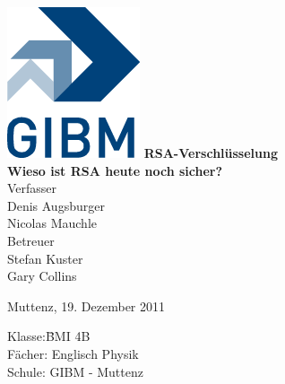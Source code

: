 \begin{titlepage}
\sffamily
\centering
\includegraphics{images/gibm_logo.png}
\vfill
{\bfseries\Huge RSA-Verschlüsselung}\\
\vfill
{\bfseries\Large Wieso ist RSA heute noch sicher?}\\
\vfill
Verfasser\\[1ex]
Denis Augsburger\\
Nicolas Mauchle\\
\vfill
Betreuer\\[1ex]
{\large Stefan Kuster}\\
{\large Gary Collins}\\
\vfill
\raggedright
\small
Muttenz, 19. Dezember 2011\\[2cm]
\begin{tabbing}
Klasse:\quad\quad\quad \=BMI 4B\\
Fächer: \> Englisch Physik \\
Schule: \> GIBM - Muttenz
\end{tabbing}
\end{titlepage}
